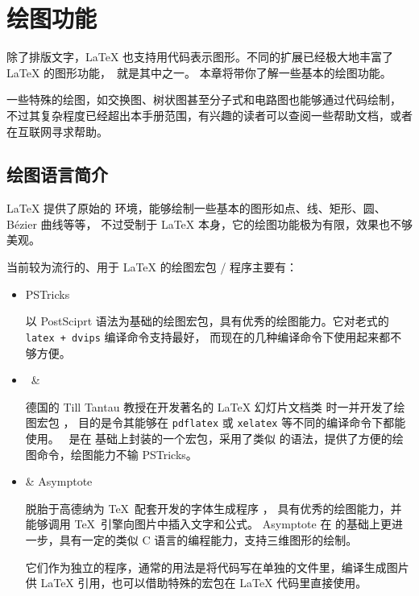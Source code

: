 \chapter{绘图功能}\label{chap:graphics}

\begin{intro}
除了排版文字，\LaTeX{} 也支持用代码表示图形。不同的扩展已经极大地丰富了 \LaTeX{} 的图形功能，\TikZ\ 就是其中之一。
本章将带你了解一些基本的绘图功能。

一些特殊的绘图，如交换图、树状图甚至分子式和电路图也能够通过代码绘制，
不过其复杂程度已经超出本手册范围，有兴趣的读者可以查阅一些帮助文档，或者在互联网寻求帮助。
\end{intro}

\section{绘图语言简介}\label{sec:pict-lang}

\LaTeX{} 提供了原始的  环境，能够绘制一些基本的图形如点、线、矩形、圆、B\'ezier 曲线等等，
不过受制于 \LaTeX{} 本身，它的绘图功能极为有限，效果也不够美观。

当前较为流行的、用于 \LaTeX{} 的绘图宏包 / 程序主要有：
\begin{itemize}
  \item PSTricks \par
  以 PostSciprt 语法为基础的绘图宏包，具有优秀的绘图能力。它对老式的 \texttt{latex + dvips} 编译命令支持最好，
  而现在的几种编译命令下使用起来都不够方便。

  \item \TikZ\ \&  \par
  德国的 Till Tantau 教授在开发著名的 \LaTeX{} 幻灯片文档类  时一并开发了绘图宏包 ，
  目的是令其能够在 \texttt{pdflatex} 或 \texttt{xelatex} 等不同的编译命令下都能使用。
  \TikZ\ 是在  基础上封装的一个宏包，采用了类似  的语法，提供了方便的绘图命令，绘图能力不输 PSTricks。

  \item {} \& Asymptote \par
   脱胎于高德纳为 \TeX\ 配套开发的字体生成程序 ，
  具有优秀的绘图能力，并能够调用 \TeX\ 引擎向图片中插入文字和公式。
  Asymptote 在  的基础上更进一步，具有一定的类似 C 语言的编程能力，支持三维图形的绘制。\par
  它们作为独立的程序，通常的用法是将代码写在单独的文件里，编译生成图片供 \LaTeX{} 引用，也可以借助特殊的宏包在 \LaTeX{} 代码里直接使用。
\end{itemize}

